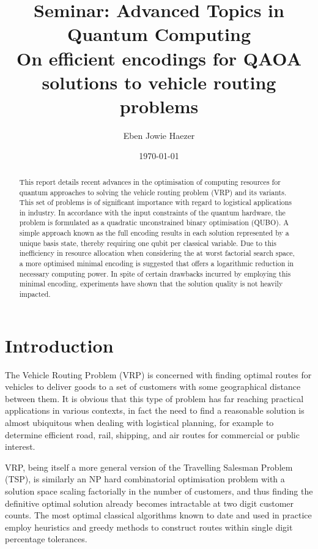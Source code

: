\documentclass {article}
\title {
	Seminar: Advanced Topics in \\
	Quantum Computing \\
	On efficient encodings for QAOA \\
	solutions to vehicle routing problems
}
\author {Eben Jowie Haezer}
\date {\today}
\begin{document}
\maketitle

\begin {abstract}
This report details recent advances in the optimisation of computing resources
for quantum approaches to solving the vehicle routing problem (VRP) and 
its variants. This set of problems is of significant importance with regard
to logistical applications in industry. In accordance with the input
constraints of the quantum hardware, the problem is formulated as a quadratic
unconstrained binary optimisation (QUBO). A simple approach known as the
full encoding results in each solution represented by a unique basis state,
thereby requiring one qubit per classical variable. Due to this inefficiency
in resource allocation when considering the at worst factorial search space,
a more optimised minimal encoding is suggested that offers a logarithmic
reduction in necessary computing power. In spite of certain drawbacks incurred
by employing this minimal encoding, experiments have shown that the solution
quality is not heavily impacted.
\end {abstract}

%

\section {Introduction}
The Vehicle Routing Problem (VRP) is concerned with finding optimal routes
for vehicles to deliver goods to a set of customers with some geographical
distance between them. It is obvious that this type of problem has far
reaching practical applications in various contexts, in fact the need to find
a reasonable solution is almost ubiquitous when dealing with logistical
planning, for example to determine efficient road, rail, shipping, and air
routes for commercial or public interest.

VRP, being itself a more general version of the Travelling Salesman Problem
(TSP), is similarly an NP hard combinatorial optimisation problem with a
solution space scaling factorially in the number of customers, and thus
finding the definitive optimal solution already becomes intractable at
two digit customer counts. The most optimal classical algorithms known to date
and used in practice employ heuristics and greedy methods to construct routes
within single digit percentage tolerances.
\end{document}
